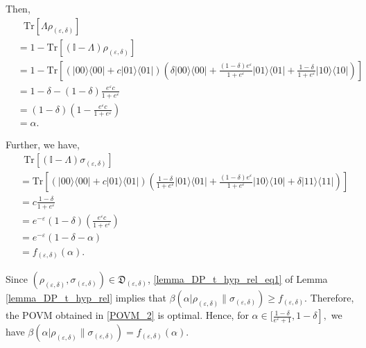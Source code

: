 \documentclass[onecolumn,ldraftcls, 11pt]{IEEEtran}
\newcommand{\tr}{\mathrm{Tr}}
\newcommand{\nn}{\nonumber}
\newcommand{\ketbra}[1]{|#1\rangle\langle#1|}
\newcommand{\eps}{\varepsilon}
\begin{document}
\begin{steps}
\quad Then, 
\begin{align}
   &~~~\tr\left[\Lambda\rho_{(\eps,\delta)}\right] \nn\\
   &=1-\tr\left[(\mathbb{I}-\Lambda)\rho_{(\eps,\delta)}\right]\nn\\
    &= 1-\tr\left[\left(\ketbra{00} + c \ketbra{01}\right) \left(\delta \ketbra{00} + \frac{(1-\delta)e^\eps}{1+e^\eps}\ketbra{01} + \frac{1-\delta}{1+e^\eps}\ketbra{10}\right)\right]\nn\\
    &= 1-\delta - (1-\delta)\frac{e^\eps  c}{1+e^\eps }\nn\\
    &= (1-\delta)\left(1 - \frac{e^\eps  c}{1+e^\eps }\right)\nn\\
    &= \alpha.\nn
\end{align}

\quad Further, we have,
\begin{align}
    &~~\tr\left[(\mathbb{I}-\Lambda)\sigma_{(\eps,\delta)}\right]\nn\\
    &= \tr\left[\left(\ketbra{00} + c \ketbra{01}\right) \left(\frac{1-\delta}{1+e^\eps}\ketbra{01} + \frac{(1-\delta)e^\eps}{1+e^\eps}\ketbra{10} + \delta\ketbra{11}\right)\right]\nn\\
    &= c\frac{1-\delta}{1+e^\eps} \nn\\
    &= e^{-\eps}(1 -\delta)\left(\frac{e^\eps c}{1 + e^\eps}\right)\nn\\
    &= e^{-\eps} (1 -\delta - \alpha)\nn\\
    & =f_{(\eps,\delta)}(\alpha).\nn
\end{align}

\quad Since $(\rho_{(\eps, \delta)},\sigma_{(\eps, \delta)})\in  \mathfrak{D}_{(\eps,\delta)}$, \eqref{lemma_DP_t_hyp_rel_eq1} of Lemma \ref{lemma_DP_t_hyp_rel} implies that $\beta(\alpha|\rho_{(\eps, \delta)}\|\sigma_{(\eps, \delta)}) \geq f_{(\eps,\delta)}$. Therefore, the POVM obtained in \eqref{POVM_2} is optimal. Hence, for $\alpha \in [\left.\frac{1-\delta}{e^\eps + 1}, 1-\delta\right],$ we have $\beta(\alpha|\rho_{(\eps,\delta)}\|\sigma_{(\eps,\delta)}) = f_{(\eps,\delta)}(\alpha).$ 




\end{steps}
\end{document}
